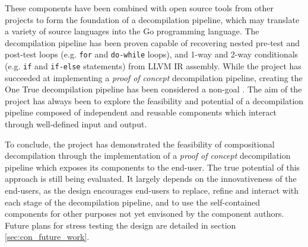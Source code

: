 These components have been combined with open source tools from other projects to form the foundation of a decompilation pipeline, which may translate a variety of source languages into the Go programming language. The decompilation pipeline has been proven capable of recovering nested pre-test and post-test loops (e.g. \texttt{for} and \texttt{do-while} loops), and 1-way and 2-way conditionals (e.g. \texttt{if} and \texttt{if-else} statements) from LLVM IR assembly. While the project has succeeded at implementing a \textit{proof of concept} decompilation pipeline, creating the One True decompilation pipeline has been considered a non-goal \cite{non-goals}. The aim of the project has always been to explore the feasibility and potential of a decompilation pipeline composed of independent and reusable components which interact through well-defined input and output.

To conclude, the project has demonstrated the feasibility of compositional decompilation through the implementation of a \textit{proof of concept} decompilation pipeline which exposes its components to the end-user. The true potential of this approach is still being evaluated. It largely depends on the innovativeness of the end-users, as the design encourages end-users to replace, refine and interact with each stage of the decompilation pipeline, and to use the self-contained components for other purposes not yet envisoned by the component authors. Future plans for stress testing the design are detailed in section \ref{sec:con_future_work}.
